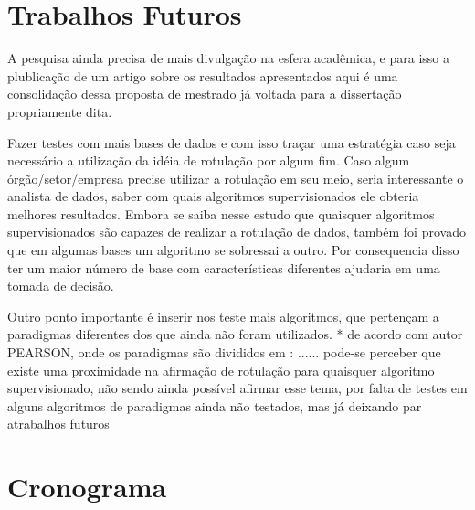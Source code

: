 \section{Trabalhos Futuros}\label{cap:fut}

A pesquisa ainda precisa de mais divulgação na esfera acadêmica, e para isso a plublicação de um artigo sobre os resultados apresentados aqui é uma consolidação dessa proposta de mestrado já voltada para a dissertação propriamente dita.

Fazer testes com mais bases de dados  e com isso traçar uma estratégia caso seja necessário a utilização da idéia de rotulação por algum fim. Caso algum órgão/setor/empresa precise utilizar a rotulação em seu meio, seria interessante o analista de dados,  saber com quais algoritmos supervisionados ele obteria melhores resultados. Embora se saiba nesse estudo que quaisquer algoritmos supervisionados são capazes de realizar a rotulação de dados, também foi provado que em algumas bases um algoritmo se sobressai a outro. Por consequencia disso ter um maior número de base com características diferentes ajudaria em uma tomada de decisão.

Outro ponto importante é inserir nos teste mais algoritmos, que pertençam a  paradigmas diferentes dos que ainda não foram utilizados. * de acordo com autor PEARSON, onde os paradigmas são divididos em :  ...... pode-se perceber que existe uma proximidade na afirmação de rotulação para quaisquer algoritmo supervisionado, não sendo ainda possível afirmar esse tema, por falta de testes em alguns algoritmos de paradigmas ainda não testados, mas já deixando par atrabalhos futuros



\section{Cronograma}\label{cap:cron}

